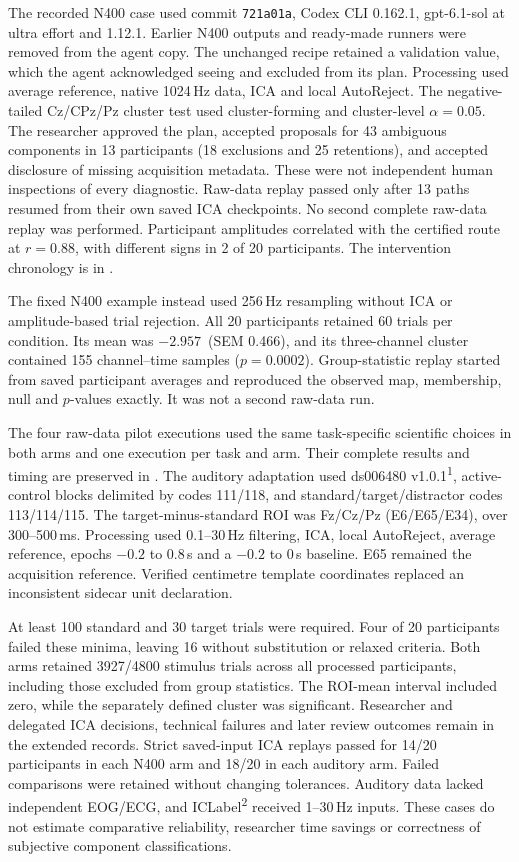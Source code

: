 The recorded N400 case used commit \texttt{721a01a}, Codex CLI 0.162.1, gpt-6.1-sol at ultra effort and \mne{} 1.12.1. Earlier N400 outputs and ready-made runners were removed from the agent copy. The unchanged recipe retained a validation value, which the agent acknowledged seeing and excluded from its plan. Processing used average reference, native 1024\,Hz data, ICA and local AutoReject. The negative-tailed Cz/CPz/Pz cluster test used cluster-forming and cluster-level \(\alpha=0.05\). The researcher approved the plan, accepted proposals for 43 ambiguous components in 13 participants (18 exclusions and 25 retentions), and accepted disclosure of missing acquisition metadata. These were not independent human inspections of every diagnostic. Raw-data replay passed only after 13 paths resumed from their own saved ICA checkpoints. No second complete raw-data replay was performed. Participant amplitudes correlated with the certified route at \(r=0.88\), with different signs in 2 of 20 participants. The intervention chronology is in .

The fixed N400 example instead used 256\,Hz resampling without ICA or amplitude-based trial rejection. All 20 participants retained 60 trials per condition. Its mean was \(-2.957\)\,\uV{} (SEM 0.466), and its three-channel cluster contained 155 channel--time samples (\(p=0.0002\)). Group-statistic replay started from saved participant averages and reproduced the observed map, membership, null and \(p\)-values exactly. It was not a second raw-data run.

The four raw-data pilot executions used the same task-specific scientific choices in both arms and one execution per task and arm. Their complete results and timing are preserved in . The auditory adaptation used ds006480 v1.0.1\textsuperscript{1}, active-control blocks delimited by codes 111/118, and standard/target/distractor codes 113/114/115. The target-minus-standard ROI was Fz/Cz/Pz (E6/E65/E34), over 300--500\,ms. Processing used 0.1--30\,Hz filtering, ICA, local AutoReject, average reference, epochs \(-0.2\) to \(0.8\)\,s and a \(-0.2\) to 0\,s baseline. E65 remained the acquisition reference. Verified centimetre template coordinates replaced an inconsistent sidecar unit declaration.

At least 100 standard and 30 target trials were required. Four of 20 participants failed these minima, leaving 16 without substitution or relaxed criteria. Both arms retained 3927/4800 stimulus trials across all processed participants, including those excluded from group statistics. The ROI-mean interval included zero, while the separately defined cluster was significant. Researcher and delegated ICA decisions, technical failures and later review outcomes remain in the extended records. Strict saved-input ICA replays passed for 14/20 participants in each N400 arm and 18/20 in each auditory arm. Failed comparisons were retained without changing tolerances. Auditory data lacked independent EOG/ECG, and ICLabel\textsuperscript{2} received 1--30\,Hz inputs. These cases do not estimate comparative reliability, researcher time savings or correctness of subjective component classifications.


